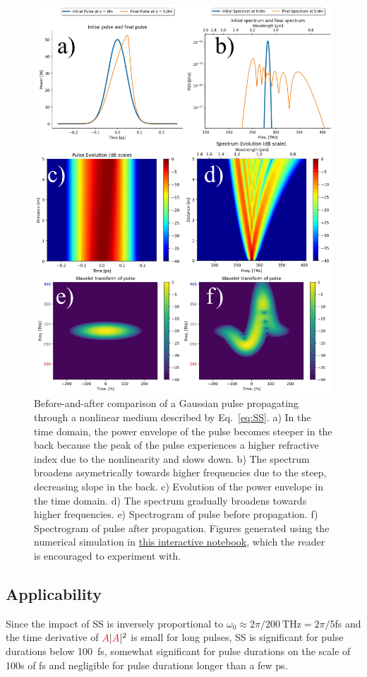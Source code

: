 \begin{figure}
    \centering
    \includegraphics[width=1.0\linewidth]{figures/SPM_and_SS_combined.png}
    \caption{Before-and-after comparison of a Gaussian pulse propagating through a nonlinear medium described by Eq.~\ref{eq:SS}. 
    a) In the time domain, the power envelope of the pulse becomes steeper in the back because the peak of the pulse experiences a higher refractive index due to the nonlinearity and slows down. b) The spectrum broadens asymetrically towards higher frequencies due to the steep, decreasing slope in the back. c) Evolution of the power envelope in the time domain. d) The spectrum gradually broadens towards higher frequencies. e) Spectrogram of pulse before propagation. f) Spectrogram of pulse after propagation. Figures generated using the numerical simulation in \href{https://colab.research.google.com/drive/1P41F4hO6Mv12RsEkpogYv5teQyFZ6iW0?usp=sharing}{this interactive notebook}, which the reader is encouraged to experiment with. }
    \label{fig:SS}
\end{figure}

\subsection{Applicability}
Since the impact of SS is inversely proportional to $\omega_0\approx 2\pi/200~\text{THz} = 2\pi/5$fs and the time derivative of $\textcolor{red}{A}|\textcolor{red}{A}|^2$ is small for long pulses, SS is significant for pulse durations below 100~fs, somewhat significant for pulse durations on the scale of 100s of fs and negligible for pulse durations longer than a few ps. 




